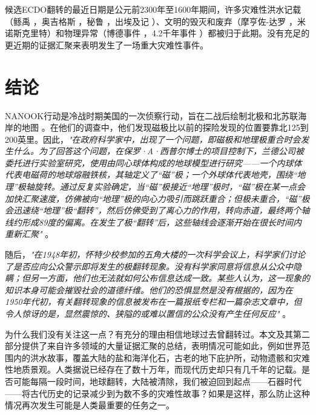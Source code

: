 \documentclass[10pt,twocolumn,letterpaper]{article}
\begin{document}
候选ECDO翻转的最近日期是公元前2300年至1600年期间，许多灾难性洪水记载（鲧禹 \cite{113,114,115}，奥吉格斯 \cite{116,117}，秘鲁 \cite{118,119}，出埃及记 \cite{120}）、文明的毁灭和废弃（摩亨佐-达罗 \cite{121}，米诺斯克里特\cite{100,101}）和物理异常（博德事件 \cite{122}，4.2千年事件 \cite{90}）都被归于此期。没有充足的更近期的证据汇聚来表明发生了一场重大灾难性事件。

\section{结论}

NANOOK行动是冷战时期美国的一次侦察行动，旨在二战后绘制北极和北苏联海岸的地图 \cite{137}。在他们的调查中，他们发现磁极比以前的探险发现的位置要靠北125到200英里。因此，\textit{"在政府科学家中，出现了一个问题，即磁极和地理极重合时会发生什么。为了回答这个问题，在保罗·A·西普尔博士的项目控制下，兰德公司被委托进行实验室研究，使用由同心球体构成的地球模型进行研究——一个内球体代表电磁荷的地球熔融铁核，其轴定义了“磁”极；一个外球体代表地壳，围绕“地理”极轴旋转。通过反复实验确定，当“磁”极接近“地理”极时，“磁”极在某一点会加快汇聚速度，仿佛被向“地理”极的向心力吸引而跳跃重合；但极未重合，“磁”极会迅速绕“地理”极“翻转”，然后仿佛受到了离心力的作用，转向赤道，最终两个轴线约形成89度的偏离。在发生了极“翻转”后，这些轴线会逐渐开始在很长时间内重新汇聚"} \cite{138,139}。

随后，\textit{"在1948年初，怀特少校参加的五角大楼的一次科学会议上，科学家们讨论了是否应向公众警示即将发生的极翻转现象。没有科学家同意将信息从公众中隐瞒；但另一方面，他们也无法就如何公布信息达成一致。某些人认为，这一现象的知识本身可能会摧毁社会的道德纤维。他们的恐惧显然是没有根据的，因为在1950年代初，有关翻转现象的信息被发布在一篇报纸专栏和一篇杂志文章中，但令人惊讶的是，显然震惊的、狭隘的或难以置信的公众没有产生任何反应"} \cite{138,139}。

为什么我们没有关注这一点？有充分的理由相信地球过去曾翻转过。本文及其第二部分提供了来自许多领域的大量证据汇聚的总结，表明情况可能如此，例如世界范围内的洪水故事，覆盖大陆的盐和海洋化石，古老的地下庇护所，动物遗骸和灾难性地质景观。人类据说已经存在了数十万年，而现代历史却只有几千年的记载。是否可能每隔一段时间，地球翻转，大陆被清除，我们被迫回到起点——石器时代——将古代历史的记录减少到为数不多的灾难性故事？如果是这样，那么防止这种情况再次发生可能是人类最重要的任务之一。
\end{document}
